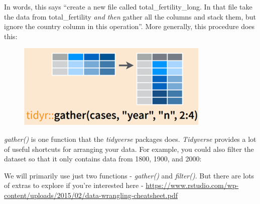\documentclass[]{article}
\newenvironment{Shaded}{\begin{snugshade}}{\end{snugshade}}
\newcommand{\KeywordTok}[1]{\textcolor[rgb]{0.13,0.29,0.53}{\textbf{#1}}}
\newcommand{\DataTypeTok}[1]{\textcolor[rgb]{0.13,0.29,0.53}{#1}}
\newcommand{\DecValTok}[1]{\textcolor[rgb]{0.00,0.00,0.81}{#1}}
\newcommand{\StringTok}[1]{\textcolor[rgb]{0.31,0.60,0.02}{#1}}
\newcommand{\OperatorTok}[1]{\textcolor[rgb]{0.81,0.36,0.00}{\textbf{#1}}}
\newcommand{\NormalTok}[1]{#1}
\begin{document}
In words, this says ``create a new file called total\_fertility\_long.
In that file take the data from total\_fertility \emph{and then} gather
all the columns and stack them, but ignore the country column in this
operation''. More generally, this procedure does this:

\begin{figure}
\centering
\includegraphics{gather.png}
\caption{}
\end{figure}

\emph{gather()} is one function that the \emph{tidyverse} packages does.
\emph{Tidyverse} provides a lot of useful shortcuts for arranging your
data. For example, you could also filter the dataset so that it only
contains data from 1800, 1900, and 2000:

\begin{Shaded}
\end{Shaded}

We will primarily use just two functions - \emph{gather()} and
\emph{filter()}. But there are lots of extras to explore if you're
interested here -
\url{https://www.rstudio.com/wp-content/uploads/2015/02/data-wrangling-cheatsheet.pdf}
\end{document}
